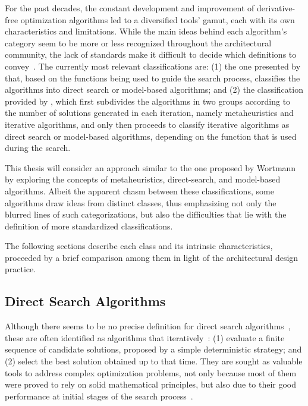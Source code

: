 	For the past decades, the constant development and improvement of derivative-free optimization algorithms led to a diversified tools' gamut, each with its own characteristics and limitations. While the main ideas behind each algorithm's category seem to be more or less recognized throughout the architectural community, the lack of standards make it difficult to decide which definitions to convey~\cite{Rios2013, Wortmann2017ADO}. The currently most relevant classifications are: (1) the one presented by \cite{Rios2013} that, based on the functions being used to guide the search process, classifies the algorithms into direct search or model-based algorithms; and (2) the classification provided by \cite{Wortmann2017ADO}, which first subdivides the algorithms in two groups according to the number of solutions generated in each iteration, namely metaheuristics and iterative algorithms, and only then proceeds to classify iterative algorithms as direct search or model-based algorithms, depending on the function that is used during the search. 

	This thesis will consider an approach similar to the one proposed by Wortmann~\cite{Wortmann2017ADO} by exploring the concepts of metaheuristics, direct-search, and model-based algorithms. Albeit the apparent chasm between these classifications, some algorithms draw ideas from distinct classes, thus emphasizing not only the blurred lines of such categorizations, but also the difficulties that lie with the definition of more standardized classifications. 
	
	The following sections describe each class and its intrinsic characteristics, proceeded by a brief comparison among them in light of the architectural design practice. 	

\subsection{Direct Search Algorithms}
\label{ssec:direct-search}

	Although there seems to be no precise definition for direct search algorithms~\cite{Kolda2003}, these are often identified as algorithms that iteratively~\cite{Kolda2003,Wortmann2016BBO}: (1) evaluate a finite sequence of candidate solutions, proposed by a simple deterministic strategy; and (2) select the best solution obtained up to that time. They are sought as valuable tools to address complex optimization problems, not only because most of them were proved to rely on solid mathematical principles, but also due to their good performance at initial stages of the search process~\cite{Rios2013, Wortmann2016BBO}. 
	
